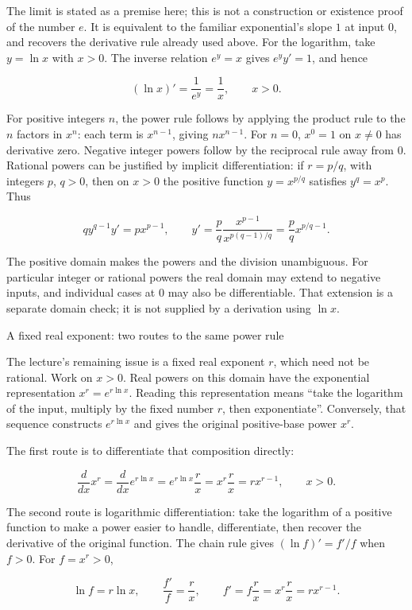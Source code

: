 \documentclass[
  11pt,
]{article}
\providecommand{\gt}{>}
\begin{document}
The limit is stated as a premise here; this is not a construction or
existence proof of the number \(e\). It is equivalent to the familiar
exponential's slope \(1\) at input \(0\), and recovers the derivative
rule already used above. For the logarithm, take \(y=\ln x\) with
\(x\gt 0\). The inverse relation \(e^y=x\) gives \(e^yy'=1\), and hence

\[(\ln x)'=\frac1{e^y}=\frac1x,\qquad x>0.\]

For positive integers \(n\), the power rule follows by applying the
product rule to the \(n\) factors in \(x^n\): each term is \(x^{n-1}\),
giving \(nx^{n-1}\). For \(n=0\), \(x^0=1\) on \(x\ne0\) has derivative
zero. Negative integer powers follow by the reciprocal rule away from
\(0\). Rational powers can be justified by implicit differentiation: if
\(r=p/q\), with integers \(p\), \(q\gt 0\), then on \(x\gt 0\) the
positive function \(y=x^{p/q}\) satisfies \(y^q=x^p\). Thus

\[qy^{q-1}y'=px^{p-1},
\qquad
y'=\frac pq\frac{x^{p-1}}{x^{p(q-1)/q}}
=\frac pqx^{p/q-1}.\]

The positive domain makes the powers and the division unambiguous. For
particular integer or rational powers the real domain may extend to
negative inputs, and individual cases at \(0\) may also be
differentiable. That extension is a separate domain check; it is not
supplied by a derivation using \(\ln x\).

A fixed real exponent: two routes to the same power rule

The lecture's remaining issue is a fixed real exponent \(r\), which need
not be rational. Work on \(x\gt 0\). Real powers on this domain have the
exponential representation \(x^r=e^{r\ln x}\). Reading this
representation means ``take the logarithm of the input, multiply by the
fixed number \(r\), then exponentiate''. Conversely, that sequence
constructs \(e^{r\ln x}\) and gives the original positive-base power
\(x^r\).

The first route is to differentiate that composition directly:

\[\frac d{dx}x^r
=\frac d{dx}e^{r\ln x}
=e^{r\ln x}\frac r x
=x^r\frac r x
=rx^{r-1},\qquad x>0.\]

The second route is logarithmic differentiation: take the logarithm of a
positive function to make a power easier to handle, differentiate, then
recover the derivative of the original function. The chain rule gives
\((\ln f)'=f'/f\) when \(f\gt 0\). For \(f=x^r\gt 0\),

\[\ln f=r\ln x,
\qquad
\frac{f'}f=\frac r x,
\qquad
f'=f\frac r x=x^r\frac r x=rx^{r-1}.\]
\end{document}
